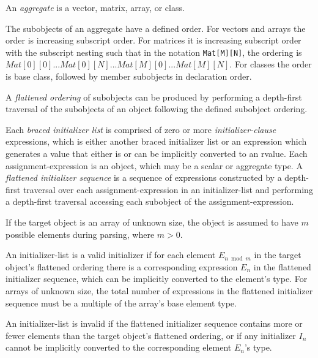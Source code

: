 
\p An \textit{aggregate} is a vector, matrix, array, or class.

\p The subobjects of an aggregate have a defined order. For vectors and arrays
the order is increasing subscript order. For matrices it is increasing subscript
order with the subscript nesting such that in the notation
\texttt{Mat[M][N]}, the ordering is \(Mat[0][0]...Mat[0][N]...
Mat[M][0]...Mat[M][N]\). For classes the order is base class, followed by member
subobjects in declaration order.

\p A \textit{flattened ordering} of subobjects can be produced by performing a
depth-first traversal of the subobjects of an object following the defined
subobject ordering.

\p Each \textit{braced initializer list} is comprised of zero or more
\textit{initializer-clause} expressions, which is either another braced
initializer list or an expression which generates a value that either is or can
be implicitly converted to an rvalue. Each assignment-expression is an object,
which may be a scalar or aggregate type. A \textit{flattened initializer
sequence} is a sequence of expressions constructed by a depth-first traversal
over each assignment-expression in an initializer-list and performing a
depth-first traversal accessing each subobject of the assignment-expression.

\p If the target object is an array of unknown size, the object is assumed to
have \(m\) possible elements during parsing, where \(m>0\).

\p An initializer-list is a valid initializer if for each element
\(E_{n \bmod m}\) in the target object's flattened ordering there is a
corresponding expression \(E_n\) in the flattened initializer sequence, which
can be implicitly converted to the element's type. For arrays of unknown size,
the total number of expressions in the flattened initializer sequence must be a
multiple of the array's base element type.

\p An initializer-list is invalid if the flattened initializer sequence contains
more or fewer elements than the target object's flattened ordering, or if any
initializer \(I_n\) cannot be implicitly converted to the corresponding element
\(E_n\)'s type.


